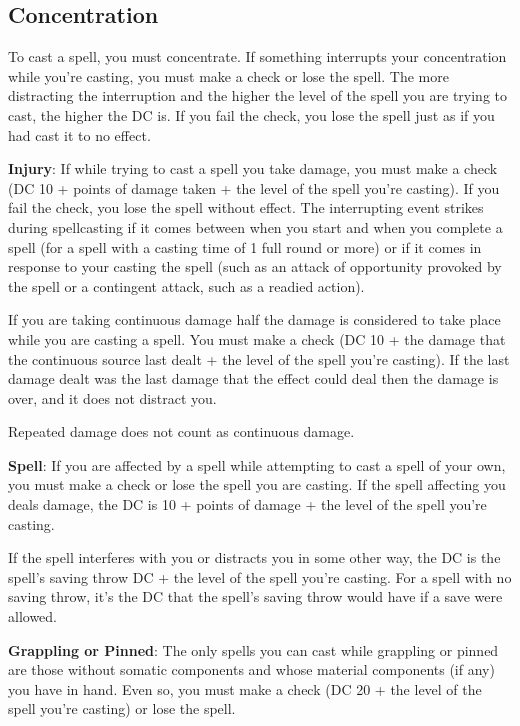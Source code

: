 \subsection{Concentration}
To cast a spell, you must concentrate. If something interrupts your concentration while you're casting, you must make a  check or lose the spell. The more distracting the interruption and the higher the level of the spell you are trying to cast, the higher the DC is. If you fail the check, you lose the spell just as if you had cast it to no effect.

\textbf{Injury}: If while trying to cast a spell you take damage, you must make a  check (DC 10 + points of damage taken + the level of the spell you're casting). If you fail the check, you lose the spell without effect. The interrupting event strikes during spellcasting if it comes between when you start and when you complete a spell (for a spell with a casting time of 1 full round or more) or if it comes in response to your casting the spell (such as an attack of opportunity provoked by the spell or a contingent attack, such as a readied action).

If you are taking continuous damage half the damage is considered to take place while you are casting a spell. You must make a  check (DC 10 + \onehalf the damage that the continuous source last dealt + the level of the spell you're casting). If the last damage dealt was the last damage that the effect could deal then the damage is over, and it does not distract you.

Repeated damage does not count as continuous damage.

\textbf{Spell}: If you are affected by a spell while attempting to cast a spell of your own, you must make a  check or lose the spell you are casting. If the spell affecting you deals damage, the DC is 10 + points of damage + the level of the spell you're casting.

If the spell interferes with you or distracts you in some other way, the DC is the spell's saving throw DC + the level of the spell you're casting. For a spell with no saving throw, it's the DC that the spell's saving throw would have if a save were allowed.

\textbf{Grappling or Pinned}: The only spells you can cast while grappling or pinned are those without somatic components and whose material components (if any) you have in hand. Even so, you must make a  check (DC 20 + the level of the spell you're casting) or lose the spell.

